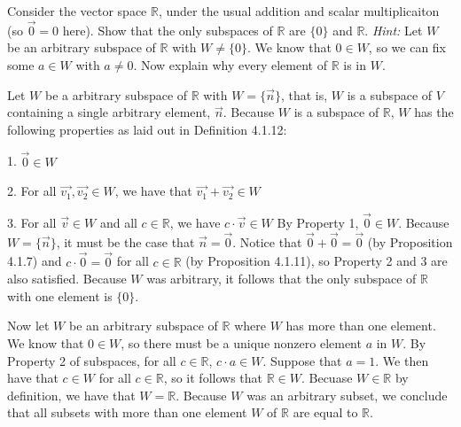 \documentclass[12pt]{article}
\newenvironment{problem}[2][Problem]
{
	\begin{trivlist} 
		\item[\hskip \labelsep {\bfseries #1 #2:}]
	}
{
	\end{trivlist}
	}
\newenvironment{solution}[1][Solution]
{
	\begin{trivlist} 
		\item[\hskip \labelsep {\itshape #1:}]
	}
	{
	\end{trivlist}
}
\begin{document}
\newpage
\begin{problem}{5}
Consider the vector space $\mathbb{R}$, under the usual addition and scalar multiplicaiton (so $\vec{0}=0$ here). Show that the only subspaces of $\mathbb{R}$ are $\{0\}$ and $\mathbb{R}$.
\newline
\noindent
{\it Hint:} Let $W$ be an arbitrary subspace of $\mathbb{R}$ with $W \neq \{0\}$. We know that $0 \in W$, so we can fix some $a \in W$ with $a \neq 0$. Now explain why every element of $\mathbb{R}$ is in $W$.
\noindent
\newline
\newline
\begin{solution}
Let $W$ be a arbitrary subspace of $\mathbb{R}$ with $W =\{\vec{n}\}$, that is, $W$ is a subspace of $V$ containing a single arbitrary element, $\vec{n}$. Because $W$ is a subspace of $\mathbb{R}$, $W$ has the following properties as laid out in Definition 4.1.12:

1. $\vec{0} \in W$

2. For all $\vec{v_1},\vec{v_2} \in W$, we have that $\vec{v_1}+\vec{v_2} \in W$

3. For all $\vec{v} \in W$ and all $c \in \mathbb{R}$, we have $c\cdot \vec{v} \in W$
\newline
\newline
\noindent
By Property 1, $\vec{0} \in W$. Because $W =\{\vec{n}\}$, it must be the case that $\vec{n}= \vec{0}$. Notice that $\vec{0}+\vec{0} = \vec{0}$ (by Proposition 4.1.7) and $c\cdot \vec{0} = \vec{0}$ for all $c \in \mathbb{R}$ (by Proposition 4.1.11), so Property 2 and 3 are also satisfied. Because $W$ was arbitrary, it follows that the only subspace of $\mathbb{R}$ with one element is $\{0\}$. 

Now let $W$ be an arbitrary subspace of $\mathbb{R}$ where $W$ has more than one element. We know that $0 \in W$, so there must be a unique nonzero element $a$ in $W$. By Property 2 of subspaces, for all $c\in \mathbb{R}$, $c\cdot a \in W$. Suppose that $a=1$. We then have that $c \in W$ for all $c \in \mathbb{R}$, so it follows that $\mathbb{R} \in W$. Becuase $W \in \mathbb{R}$ by definition, we have that $W = \mathbb{R}$. Because $W$ was an arbitrary subset, we conclude that all subsets with more than one element $W$ of $\mathbb{R}$ are equal to $\mathbb{R}$.


\end{solution}
\end{problem}
\end{document}
